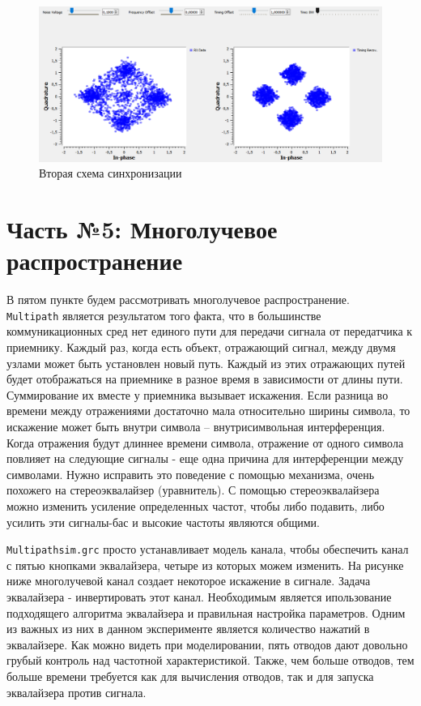 \documentclass[a4paper]{article}
\begin{document}
            \begin{figure}[H]
                \centering
                \includegraphics[width=\textwidth]{ex_4_3.png}
                \caption{Вторая схема синхронизации}
                \label{fig:ex_4_3}
            \end{figure}
            
    \newpage
        \section{Часть №5: Многолучевое распространение}
            В пятом пункте будем рассмотривать многолучевое распространение. \\\texttt{Multipath} является результатом того факта, что в большинстве коммуникационных сред нет единого пути для передачи сигнала от передатчика к приемнику. Каждый раз, когда есть объект, отражающий сигнал, между двумя узлами может быть установлен новый путь. Каждый из этих отражающих путей будет отображаться на приемнике в разное время в зависимости от длины пути. Суммирование их вместе у приемника вызывает искажения. Если разница во времени между отражениями достаточно мала относительно ширины символа, то искажение может быть внутри символа – внутрисимвольная интерференция. Когда отражения будут длиннее времени символа, отражение от одного символа повлияет на следующие сигналы - еще одна причина для интерференции между символами. Нужно исправить это поведение с помощью механизма, очень похожего на стереоэквалайзер (уравнитель). С помощью стереоэквалайзера можно изменить усиление определенных частот, чтобы либо подавить, либо усилить эти сигналы-бас и высокие частоты являются общими.
            
            \texttt{Multipathsim.grc} просто устанавливает модель канала, чтобы обеспечить канал с пятью кнопками эквалайзера, четыре из которых можем изменить. На рисунке ниже многолучевой канал создает некоторое искажение в сигнале. Задача эквалайзера - инвертировать этот канал. Необходимым является ипользование подходящего алгоритма эквалайзера и правильная настройка параметров. Одним из важных из них в данном эксперименте является количество нажатий в эквалайзере. Как можно видеть при моделировании, пять отводов дают довольно грубый контроль над частотной характеристикой. Также, чем больше отводов, тем больше времени требуется как для вычисления отводов, так и для запуска эквалайзера против сигнала.
            
\end{document}
